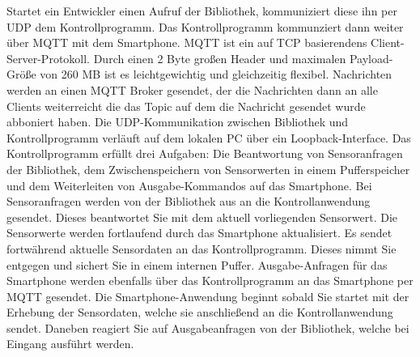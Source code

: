 \documentclass[11pt,a4paper]{report}
\begin{document}
Startet ein Entwickler einen Aufruf der Bibliothek, kommuniziert diese ihn per UDP dem Kontrollprogramm.
Das Kontrollprogramm kommunziert dann weiter über MQTT mit dem Smartphone.
MQTT ist ein auf TCP basierendens Client-Server-Protokoll.
Durch einen 2 Byte großen Header und maximalen Payload-Größe von 260 MB ist es leichtgewichtig und gleichzeitig flexibel.
Nachrichten werden an einen MQTT Broker gesendet, der die Nachrichten dann an alle Clients weiterreicht die das Topic auf dem die Nachricht gesendet wurde abboniert haben.
Die UDP-Kommunikation zwischen Bibliothek und Kontrollprogramm verläuft auf dem lokalen PC über ein Loopback-Interface.
Das Kontrollprogramm erfüllt drei Aufgaben: Die Beantwortung von Sensoranfragen der Bibliothek, dem Zwischenspeichern von Sensorwerten in einem Pufferspeicher und dem Weiterleiten von Ausgabe-Kommandos auf das Smartphone.
Bei Sensoranfragen werden von der Bibliothek aus an die Kontrollanwendung gesendet.
Dieses beantwortet Sie mit dem aktuell vorliegenden Sensorwert.
Die Sensorwerte werden fortlaufend durch das Smartphone aktualisiert.
Es sendet fortwährend aktuelle Sensordaten an das Kontrollprogramm.
Dieses nimmt Sie entgegen und sichert Sie in einem internen Puffer.
Ausgabe-Anfragen für das Smartphone werden ebenfalls über das Kontrollprogramm an das Smartphone per MQTT gesendet.
Die Smartphone-Anwendung beginnt sobald Sie startet mit der Erhebung der Sensordaten, welche sie anschließend an die Kontrollanwendung sendet.
Daneben reagiert Sie auf Ausgabeanfragen von der Bibliothek, welche bei Eingang ausführt werden.
\end{document}
